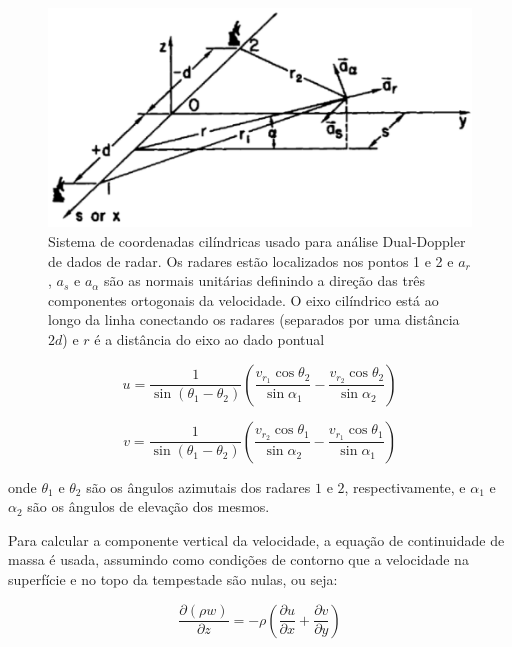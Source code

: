 \begin{figure}[htb]
	\begin{center}
		\caption{Sistema de coordenadas cilíndricas usado para análise Dual-Doppler de dados de radar. Os radares estão localizados nos pontos 1 e 2 e $a_r$, $a_s$ e $a_\alpha$ são as normais unitárias definindo a direção das três componentes ortogonais da velocidade. O eixo cilíndrico está ao longo da linha conectando os radares (separados por uma distância $2d$) e $r$ é a distância do eixo ao dado pontual} 
		\label{doviak_sistema}
		\includegraphics[width=0.8\columnwidth]{figs/system_doviak.png}
	\end{center}
\end{figure}

\begin{equation}
	u=\frac{1}{\sin{(\theta_1 - \theta_2)}}\left(\frac{v_{r_1}\cos{\theta_2}}{\sin{\alpha_1}}-\frac{v_{r_2}\cos{\theta_2}}{\sin{\alpha_2}}\right)
\end{equation}

\begin{equation}
	v=\frac{1}{\sin{(\theta_1 - \theta_2)}}\left(\frac{v_{r_2}\cos{\theta_1}}{\sin{\alpha_2}}-\frac{v_{r_1}\cos{\theta_1}}{\sin{\alpha_1}}\right)
\end{equation}

\noindent
onde $\theta_1$ e $\theta_2$ são os ângulos azimutais dos radares $1$ e $2$, respectivamente, e $\alpha_1$ e $\alpha_2$ são os ângulos de elevação dos mesmos.

Para calcular a componente vertical da velocidade, a equação de continuidade de massa é usada, assumindo como condições de contorno que a velocidade na superfície e no topo da tempestade são nulas, ou seja:

\begin{equation} 
	\label{continuidade_massa}
	\frac{\partial(\rho w)}{\partial z}=-\rho\left(\frac{\partial u}{\partial x} + \frac{\partial v}{\partial y}\right)
\end{equation}

